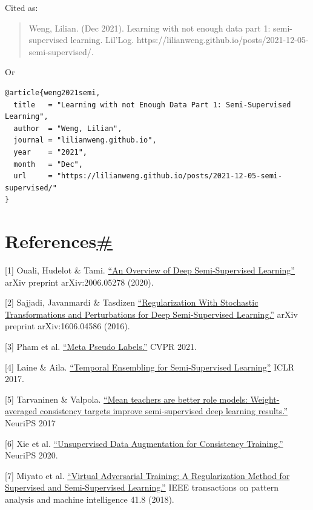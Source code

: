Cited as:

\begin{quote}
Weng, Lilian. (Dec 2021). Learning with not enough data part 1: semi-supervised learning. Lil'Log. https://lilianweng.github.io/posts/2021-12-05-semi-supervised/.
\end{quote}

Or

\begin{verbatim}
@article{weng2021semi,
  title   = "Learning with not Enough Data Part 1: Semi-Supervised Learning",
  author  = "Weng, Lilian",
  journal = "lilianweng.github.io",
  year    = "2021",
  month   = "Dec",
  url     = "https://lilianweng.github.io/posts/2021-12-05-semi-supervised/"
}
\end{verbatim}

\section{\texorpdfstring{References\hyperref[references]{\#}}{References\#}}\label{references}

{[}1{]} Ouali, Hudelot \& Tami. \href{https://arxiv.org/abs/2006.05278}{``An Overview of Deep Semi-Supervised Learning''} arXiv preprint arXiv:2006.05278 (2020).

{[}2{]} Sajjadi, Javanmardi \& Tasdizen \href{https://arxiv.org/abs/1606.04586}{``Regularization With Stochastic Transformations and Perturbations for Deep Semi-Supervised Learning.''} arXiv preprint arXiv:1606.04586 (2016).

{[}3{]} Pham et al. \href{https://arxiv.org/abs/2003.10580}{``Meta Pseudo Labels.''} CVPR 2021.

{[}4{]} Laine \& Aila. \href{https://arxiv.org/abs/1610.02242}{``Temporal Ensembling for Semi-Supervised Learning''} ICLR 2017.

{[}5{]} Tarvaninen \& Valpola. \href{https://arxiv.org/abs/1703.01780}{``Mean teachers are better role models: Weight-averaged consistency targets improve semi-supervised deep learning results.''} NeuriPS 2017

{[}6{]} Xie et al. \href{https://arxiv.org/abs/1904.12848}{``Unsupervised Data Augmentation for Consistency Training.''} NeuriPS 2020.

{[}7{]} Miyato et al. \href{https://arxiv.org/abs/1704.03976}{``Virtual Adversarial Training: A Regularization Method for Supervised and Semi-Supervised Learning.''} IEEE transactions on pattern analysis and machine intelligence 41.8 (2018).

